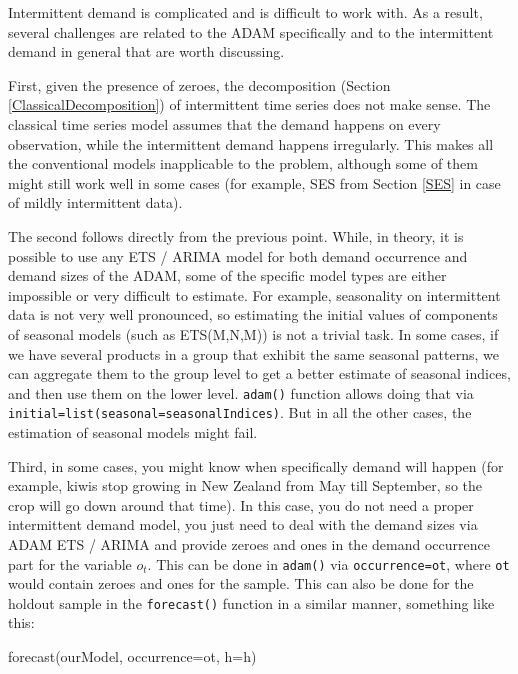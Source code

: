 \documentclass[
]{book}
\newenvironment{Shaded}{\begin{snugshade}}{\end{snugshade}}
\newcommand{\AttributeTok}[1]{\textcolor[rgb]{0.77,0.63,0.00}{#1}}
\newcommand{\FunctionTok}[1]{\textcolor[rgb]{0.00,0.00,0.00}{#1}}
\newcommand{\NormalTok}[1]{#1}
\theoremstyle{definition}
\theoremstyle{definition}
\theoremstyle{definition}
\theoremstyle{definition}
\theoremstyle{remark}
\begin{document}
Intermittent demand is complicated and is difficult to work with. As a result, several challenges are related to the ADAM specifically and to the intermittent demand in general that are worth discussing.

First, given the presence of zeroes, the decomposition (Section \ref{ClassicalDecomposition}) of intermittent time series does not make sense. The classical time series model assumes that the demand happens on every observation, while the intermittent demand happens irregularly. This makes all the conventional models inapplicable to the problem, although some of them might still work well in some cases (for example, SES from Section \ref{SES} in case of mildly intermittent data).

The second follows directly from the previous point. While, in theory, it is possible to use any ETS / ARIMA model for both demand occurrence and demand sizes of the ADAM, some of the specific model types are either impossible or very difficult to estimate. For example, seasonality on intermittent data is not very well pronounced, so estimating the initial values of components of seasonal models (such as ETS(M,N,M)) is not a trivial task. In some cases, if we have several products in a group that exhibit the same seasonal patterns, we can aggregate them to the group level to get a better estimate of seasonal indices, and then use them on the lower level. \texttt{adam()} function allows doing that via \texttt{initial=list(seasonal=seasonalIndices)}. But in all the other cases, the estimation of seasonal models might fail.

Third, in some cases, you might know when specifically demand will happen (for example, kiwis stop growing in New Zealand from May till September, so the crop will go down around that time). In this case, you do not need a proper intermittent demand model, you just need to deal with the demand sizes via ADAM ETS / ARIMA and provide zeroes and ones in the demand occurrence part for the variable \(o_t\). This can be done in \texttt{adam()} via \texttt{occurrence=ot}, where \texttt{ot} would contain zeroes and ones for the sample. This can also be done for the holdout sample in the \texttt{forecast()} function in a similar manner, something like this:

\begin{Shaded}
\begin{Highlighting}[]
\FunctionTok{forecast}\NormalTok{(ourModel, }\AttributeTok{occurrence=}\NormalTok{ot, }\AttributeTok{h=}\NormalTok{h)}
\end{Highlighting}
\end{Shaded}
\end{document}
